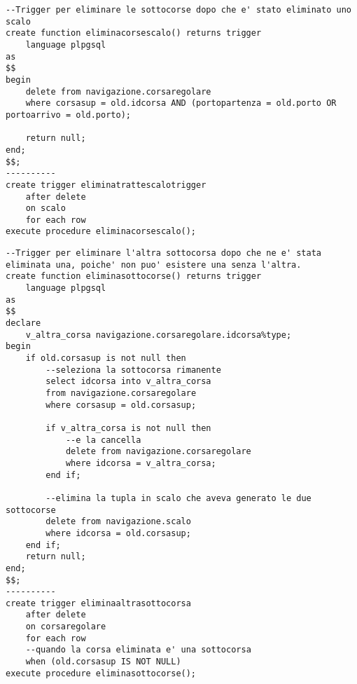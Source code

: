 \begin{lstlisting}[style = sqlstyle]
--Trigger per eliminare le sottocorse dopo che e' stato eliminato uno scalo
create function eliminacorsescalo() returns trigger
    language plpgsql
as
$$
begin
    delete from navigazione.corsaregolare
    where corsasup = old.idcorsa AND (portopartenza = old.porto OR portoarrivo = old.porto);
    
    return null;
end;
$$;
----------
create trigger eliminatrattescalotrigger
    after delete
    on scalo
    for each row
execute procedure eliminacorsescalo();

\end{lstlisting}

\begin{lstlisting}[style = sqlstyle]
--Trigger per eliminare l'altra sottocorsa dopo che ne e' stata eliminata una, poiche' non puo' esistere una senza l'altra. 
create function eliminasottocorse() returns trigger
    language plpgsql
as
$$
declare
    v_altra_corsa navigazione.corsaregolare.idcorsa%type;
begin
    if old.corsasup is not null then
        --seleziona la sottocorsa rimanente
        select idcorsa into v_altra_corsa
        from navigazione.corsaregolare
        where corsasup = old.corsasup;

        if v_altra_corsa is not null then
            --e la cancella
            delete from navigazione.corsaregolare
            where idcorsa = v_altra_corsa;
        end if;
        
        --elimina la tupla in scalo che aveva generato le due sottocorse
        delete from navigazione.scalo
        where idcorsa = old.corsasup;
    end if;
    return null;
end;
$$;
----------
create trigger eliminaaltrasottocorsa
    after delete
    on corsaregolare
    for each row
    --quando la corsa eliminata e' una sottocorsa
    when (old.corsasup IS NOT NULL)
execute procedure eliminasottocorse();

\end{lstlisting}

